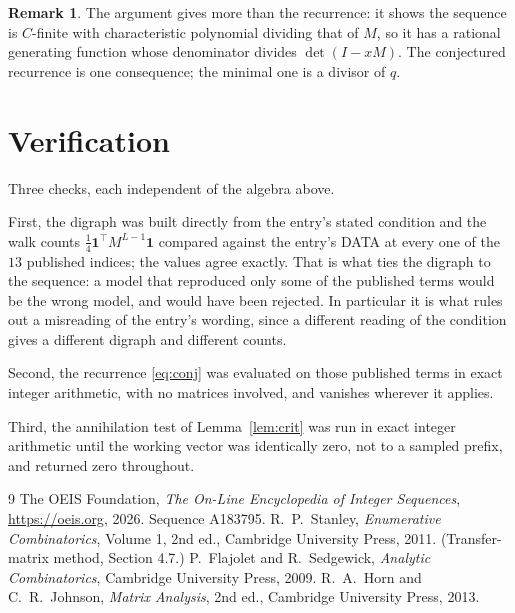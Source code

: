 \documentclass[11pt,a4paper]{article}
\theoremstyle{plain}
\theoremstyle{definition}
\newtheorem{remark}[theorem]{Remark}
\begin{document}
\begin{remark}
The argument gives more than the recurrence: it shows the sequence is $C$-finite with
characteristic polynomial dividing that of $M$, so it has a rational generating function
whose denominator divides $\det(I-xM)$. The conjectured recurrence is one consequence; the
minimal one is a divisor of $q$.
\end{remark}

\section{Verification}

Three checks, each independent of the algebra above.

First, the digraph was built directly from the entry's stated condition and the walk counts
$\tfrac1{4}\mathbf{1}^{\!\top}M^{L-1}\mathbf{1}$ compared against the entry's DATA at
every one of the $13$ published indices; the values agree exactly. That is what ties
the digraph to the sequence: a model that reproduced only some of the published terms would
be the wrong model, and would have been rejected. In particular it is what rules out a
misreading of the entry's wording, since a different reading of the condition gives a
different digraph and different counts.

Second, the recurrence \eqref{eq:conj} was evaluated on those published terms in exact
integer arithmetic, with no matrices involved, and vanishes wherever it applies.

Third, the annihilation test of Lemma~\ref{lem:crit} was run in exact integer arithmetic
until the working vector was identically zero, not to a sampled prefix, and returned zero
throughout.

\begin{thebibliography}{9}
 The OEIS Foundation, \emph{The On-Line Encyclopedia of Integer
Sequences}, \url{https://oeis.org}, 2026. Sequence A183795.
 R.~P.~Stanley, \emph{Enumerative Combinatorics}, Volume 1, 2nd ed.,
Cambridge University Press, 2011. (Transfer-matrix method, Section 4.7.)
 P.~Flajolet and R.~Sedgewick, \emph{Analytic Combinatorics}, Cambridge
University Press, 2009.
 R.~A.~Horn and C.~R.~Johnson, \emph{Matrix Analysis}, 2nd ed., Cambridge
University Press, 2013.
\end{thebibliography}
\end{document}
